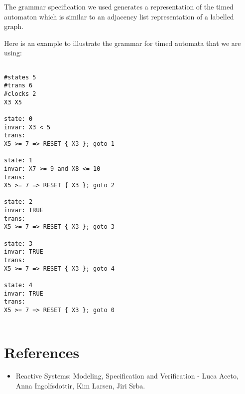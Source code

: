 \documentclass{article}
\begin{document}
The grammar specification we used generates a representation of the
timed automaton which is similar to an adjacency list representation
of a labelled graph.

Here is an example to illustrate the grammar for timed automata that
we are using:

\begin{verbatim}

#states 5
#trans 6
#clocks 2
X3 X5

state: 0
invar: X3 < 5
trans:
X5 >= 7 => RESET { X3 }; goto 1

state: 1
invar: X7 >= 9 and X8 <= 10
trans:
X5 >= 7 => RESET { X3 }; goto 2

state: 2
invar: TRUE
trans:
X5 >= 7 => RESET { X3 }; goto 3

state: 3
invar: TRUE
trans:
X5 >= 7 => RESET { X3 }; goto 4

state: 4
invar: TRUE
trans:
X5 >= 7 => RESET { X3 }; goto 0


\end{verbatim}

\section{References}

\begin{itemize}
\item Reactive Systems: Modeling, Specification and Verification -
  Luca Aceto, Anna Ingolfsdottir, Kim Larsen, Jiri Srba.
\end{itemize}
\end{document}
